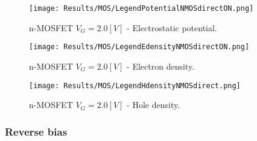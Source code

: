 \clearpage

\begin{figure}[!h]
\centering
{}
\hspace{0.06\textwidth}
\hspace{0.04\textwidth}
{\texttt{[image: Results/MOS/LegendPotentialNMOSdirectON.png]}}
\caption{n-MOSFET $V_G = 2.0 [V]$ - Electrostatic potential.}
\label{fig: potential mos}
\end{figure}

\vspace{0.5cm}

\begin{figure}[!h]
\centering
{}
\hspace{0.06\textwidth}
\hspace{0.04\textwidth}
{\texttt{[image: Results/MOS/LegendEdensityNMOSdirectON.png]}}
\caption{n-MOSFET $V_G = 2.0 [V]$ - Electron density.}
\label{fig: ndensity mos}
\end{figure}

\vspace{0.5cm}

\begin{figure}[!h]
\centering
{}
\hspace{0.06\textwidth}
\hspace{0.04\textwidth}
{\texttt{[image: Results/MOS/LegendHdensityNMOSdirect.png]}}
\caption{n-MOSFET $V_G = 2.0 [V]$ - Hole density.}
\label{fig: pdensity mos}
\end{figure}




\subsubsection{Reverse bias}
\label{sec: inv pol mos}

